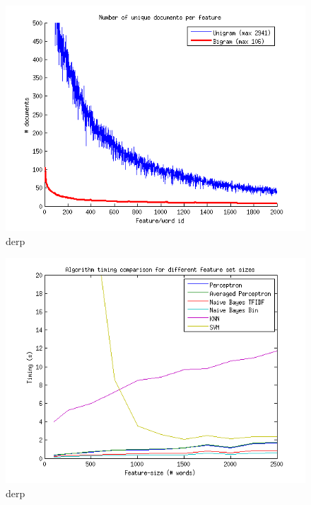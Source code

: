 \begin{figure}[H]
\centering
\includegraphics[scale = 0.5]{../Plottar/documents_per_feature.png}
\caption{derp}
\label{fig:trainingsize}
\end{figure} 

\begin{figure}[H]
\centering
\includegraphics[scale = 0.5]{../Plottar/feature_size_TIMING.png}
\caption{derp}
\label{fig:trainingsize}
\end{figure} 

